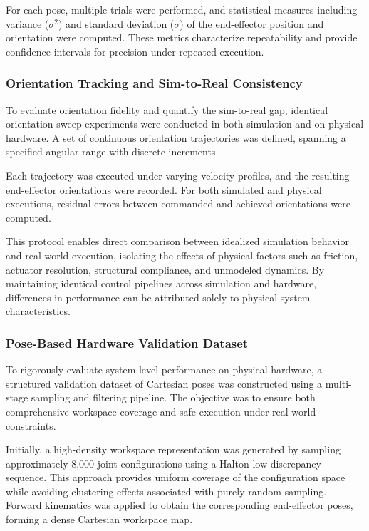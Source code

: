 \documentclass[conference]{IEEEtran}
\begin{document}
	For each pose, multiple trials were performed, and statistical measures including variance ($\sigma^2$) and standard deviation ($\sigma$) of the end-effector position and orientation were computed. These metrics characterize repeatability and provide confidence intervals for precision under repeated execution.
	
	\subsubsection{Orientation Tracking and Sim-to-Real Consistency}
	
	To evaluate orientation fidelity and quantify the sim-to-real gap, identical orientation sweep experiments were conducted in both simulation and on physical hardware. A set of continuous orientation trajectories was defined, spanning a specified angular range with discrete increments.
	
	Each trajectory was executed under varying velocity profiles, and the resulting end-effector orientations were recorded. For both simulated and physical executions, residual errors between commanded and achieved orientations were computed.
	
	This protocol enables direct comparison between idealized simulation behavior and real-world execution, isolating the effects of physical factors such as friction, actuator resolution, structural compliance, and unmodeled dynamics. By maintaining identical control pipelines across simulation and hardware, differences in performance can be attributed solely to physical system characteristics.
	
	\subsubsection{Pose-Based Hardware Validation Dataset}
	
	To rigorously evaluate system-level performance on physical hardware, a structured validation dataset of Cartesian poses was constructed using a multi-stage sampling and filtering pipeline. The objective was to ensure both comprehensive workspace coverage and safe execution under real-world constraints.
	
	Initially, a high-density workspace representation was generated by sampling approximately 8,000 joint configurations using a Halton low-discrepancy sequence. This approach provides uniform coverage of the configuration space while avoiding clustering effects associated with purely random sampling. Forward kinematics was applied to obtain the corresponding end-effector poses, forming a dense Cartesian workspace map.
	
\end{document}
